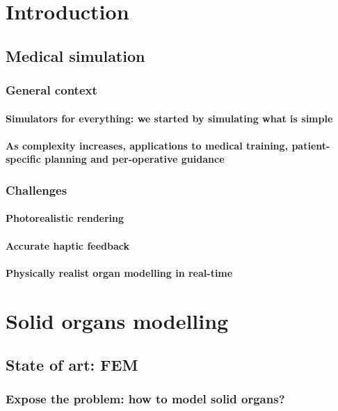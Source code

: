 \part{Introduction}

	\chapter{Medical simulation}
		\section{General context}
			\subsection{Simulators for everything: we started by simulating what is simple}
			\subsection{As complexity increases, applications to medical training, patient-specific planning and per-operative guidance}
		\section{Challenges}					
			\subsection{Photorealistic rendering}
			\subsection{Accurate haptic feedback}
			\subsection{Physically realist organ modelling in real-time}
			 
	

	



\part{Solid organs modelling}

	\chapter{State of art: FEM}
		\section{Expose the problem: how to model solid organs?}
